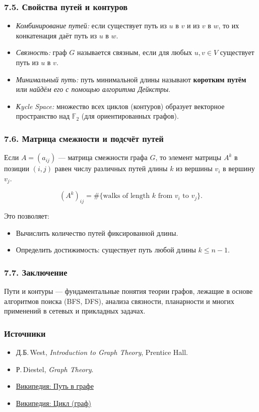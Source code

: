 \subsubsection{7.5. Свойства путей и контуров}

\begin{itemize}[leftmargin=*]
  \item \emph{Комбинирование путей:} если существует путь из $u$ в $v$ и из $v$ в $w$, то их конкатенация даёт путь из $u$ в $w$.
  \item \emph{Связность:} граф $G$ называется связным, если для любых $u,v\in V$ существует путь из $u$ в $v$.
  \item \emph{Минимальный путь:} путь минимальной длины называют \textbf{коротким путём} или \emph{найдём его с помощью алгоритма Дейкстры}.
  \item \emph{Кycle Space:} множество всех циклов (контуров) образует векторное пространство над $\mathbb{F}_2$ (для ориентированных графов).
\end{itemize}

\subsubsection{7.6. Матрица смежности и подсчёт путей}

Если $A = (a_{ij})$ — матрица смежности графа $G$, то элемент матрицы $A^k$ в позиции $(i,j)$ равен числу различных путей длины $k$ из вершины $v_i$ в вершину $v_j$.

\[
  (A^k)_{ij} = \#\{\text{walks of length }k \text{ from }v_i\text{ to }v_j\}.
\]

Это позволяет:
\begin{itemize}[leftmargin=*]
  \item Вычислить количество путей фиксированной длины.
  \item Определить достижимость: существует путь любой длины $k\le n-1$.
\end{itemize}

\subsubsection{7.7. Заключение}

Пути и контуры — фундаментальные понятия теории графов, лежащие в основе алгоритмов поиска (BFS, DFS), анализа связности, планарности и многих применений в сетевых и прикладных задачах.

\subsubsection{Источники}

\begin{itemize}
  \item Д.Б.\,West, \emph{Introduction to Graph Theory}, Prentice Hall.
  \item Р.\,Diestel, \emph{Graph Theory}.
  \item \href{https://ru.wikipedia.org/wiki/Путь_в_графе}{Википедия: Путь в графе}
  \item \href{https://ru.wikipedia.org/wiki/Цикл_в_графе}{Википедия: Цикл (граф)}
\end{itemize}

